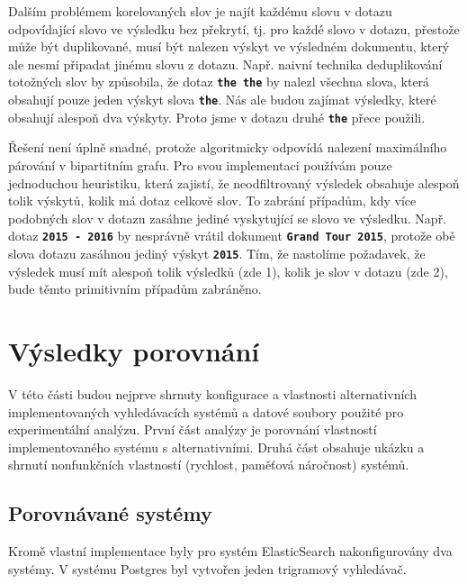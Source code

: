 \documentclass[11pt,letterpaper,oneside,openright]{book}
\newcommand{\bftt}[1]{\texttt{\textbf{#1}}}
\begin{document}
Dalším problémem korelovaných slov je najít každému slovu v dotazu odpovídající
slovo ve výsledku bez překrytí, tj. pro každé slovo v dotazu, přestože může být
duplikované, musí být nalezen výskyt ve výsledném dokumentu, který ale nesmí
připadat jinému slovu z dotazu. Např. naivní technika deduplikování totožných
slov by způsobila, že dotaz \bftt{the the} by nalezl všechna slova, která
obsahují pouze jeden výskyt slova \bftt{the}. Nás ale budou zajímat výsledky,
které obsahují alespoň dva výskyty. Proto jsme v dotazu druhé \bftt{the} přece
použili.

Řešení není úplně snadné, protože algoritmicky odpovídá nalezení maximálního
párování v bipartitním grafu. Pro svou implementaci používám pouze jednoduchou
heuristiku, která zajistí, že neodfiltrovaný výsledek obsahuje alespoň tolik
výskytů, kolik má dotaz celkově slov. To zabrání případům, kdy více podobných
slov v dotazu zasáhne jediné vyskytující se slovo ve výsledku. Např. dotaz
\bftt{2015 - 2016} by nesprávně vrátil dokument \bftt{Grand Tour 2015}, protože
obě slova dotazu zasáhnou jediný výskyt \bftt{2015}. Tím, že nastolíme
požadavek, že výsledek musí mít alespoň tolik výsledků (zde 1), kolik je slov v
dotazu (zde 2), bude těmto primitivním případům zabráněno.




\chapter{Výsledky porovnání}
V této části budou nejprve shrnuty konfigurace a vlastnosti alternativních
implementovaných vyhledávacích systémů a datové soubory použité pro
experimentální analýzu.  První část analýzy je porovnání vlastností
implementovaného systému s alternativními. Druhá část obsahuje ukázku a shrnutí
nonfunkčních vlastností (rychlost, paměťová náročnost) systémů.

\section{Porovnávané systémy}
Kromě vlastní implementace byly pro systém ElasticSearch nakonfigurovány dva
systémy. V systému Postgres byl vytvořen jeden trigramový vyhledávač.
\end{document}
